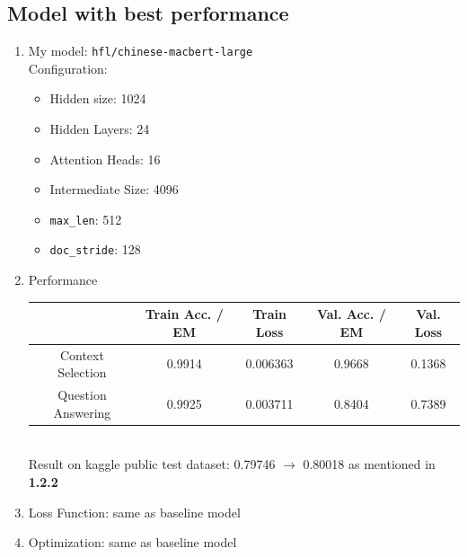 \documentclass{homeworg}
\newcommand{\hug}{\emoji{hugs}\phantom{x}}
\begin{document}
\subsection{Model with best performance}
\begin{enumerate}
    \item My model: \hug \texttt{hfl/chinese-macbert-large} \\
    Configuration:
    \begin{itemize}
        \item Hidden size: 1024
        \item Hidden Layers: 24
        \item Attention Heads: 16
        \item Intermediate Size: 4096
        \item \texttt{max\_len}: 512
        \item \texttt{doc\_stride}: 128
    \end{itemize}
    \item Performance\\
        \begin{tabular}{c|c|c|c|c}
            & Train Acc. / EM & Train Loss & Val. Acc. / EM & Val. Loss \\ 
            \hline Context Selection & 0.9914 & 0.006363 & 0.9668 & 0.1368 \\
            \hline Question Answering & 0.9925 & 0.003711 & 0.8404 & 0.7389
        \end{tabular}\vspace{10pt}\\ 
        Result on kaggle public test dataset:
        0.79746 $\rightarrow$ 0.80018 as mentioned in \textbf{1.2.2}
    \item Loss Function: same as baseline model
    \item Optimization: same as baseline model
\end{enumerate}
\end{document}

